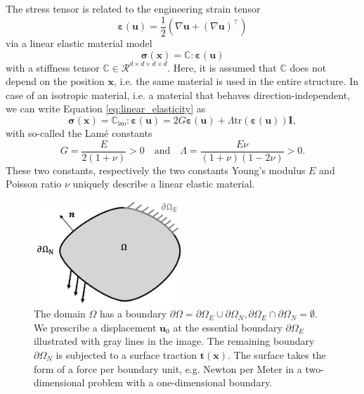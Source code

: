 The stress tensor is related to the engineering strain tensor 
\begin{equation}
    \pmb{\varepsilon}(\mathbf{u}) = \frac{1}{2} \left(\nabla \mathbf{u} + \left(\nabla \mathbf{u}\right)^\top \right)
    \label{eq:strain}
\end{equation} 
via a linear elastic material model 
\begin{equation}
    \pmb{\sigma}(\mathbf{x})  = \mathbb{C}  : \pmb{\varepsilon}(\mathbf{u}) 
    \label{eq:linear_elasticity}
\end{equation}
with a stiffness tensor $\mathbb{C}  \in \mathcal{R}^{d \times d \times d \times d}$. Here, it is assumed that $\mathbb{C}$ does not depend on the position $\mathbf{x}$, i.e. the same material is used in the entire structure. In case of an isotropic material, i.e. a material that behaves direction-independent, we can write Equation \eqref{eq:linear_elasticity} as
\begin{equation}
    \pmb{\sigma}(\mathbf{x}) = \mathbb{C}_\textrm{iso}  : \pmb{\varepsilon}(\mathbf{u})  =  2 G \pmb{\varepsilon}(\mathbf{u})  + \Lambda \textrm{tr}(\pmb{\varepsilon}(\mathbf{u}) ) \mathbf{I},
    \label{eq:isotropic_material}
\end{equation}
with so-called the Lamé constants 
\begin{equation}
    G = \frac{E}{2(1+\nu)} > 0 
    \quad \text{and} \quad 
    \Lambda = \frac{E\nu}{(1+\nu)(1-2\nu)} > 0 .
\end{equation} 
These two constants, respectively the two constants Young's modulus $E$ and Poisson ratio $\nu$ uniquely describe a linear elastic material. 

\begin{figure}[!htpb]
    \centering
    \includegraphics[width=0.5\textwidth]{figures/boundaries.png}
    \caption{The domain $\Omega$ has a boundary $\partial \Omega = \partial \Omega_E \cup \partial \Omega_N, \partial \Omega_E \cap \partial \Omega_N = \emptyset$. We prescribe a displacement $\mathbf{u}_0$ at the essential boundary $\partial \Omega_E$ illustrated with gray lines in the image. The remaining boundary $\partial \Omega_N$ is subjected to a surface traction $\mathbf{t}(\mathbf{x})$. The surface takes the form of a force per boundary unit, e.g. Newton per Meter in a two-dimensional problem with a one-dimensional boundary.}
    \label{fig:boundaries}
\end{figure}

